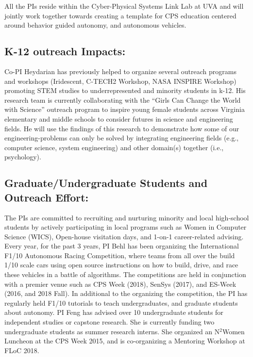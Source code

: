 All the PIs reside within the Cyber-Physical Systems Link Lab at UVA and will jointly work together towards creating a template for CPS education centered around behavior guided autonomy, and autonomous vehicles. 

\subsection{K-12 outreach Impacts:}
Co-PI Heydarian has previously helped to organize several outreach programs and workshops (Iridescent, C-TECH2 Workshop, NASA INSPIRE Workshop) promoting STEM studies to underrepresented and minority students in k-12. His research team is currently collaborating with the “Girls Can Change the World with Science” outreach program to inspire young female students across Virginia elementary and middle schools to consider futures in science and engineering fields. He will use the findings of this research to demonstrate how some of our engineering-problems can only be solved by integrating engineering fields (e.g., computer science, system engineering) and other domain(s) together (i.e., psychology). 



\subsection{Graduate/Undergraduate Students and Outreach Effort:}
The PIs are committed to recruiting and nurturing minority and local high-school students by actively participating in local programs such as Women in Computer Science (WICS),  Open-house visitation days, and 1-on-1 career-related advising.
Every year, for the past 3 years, PI Behl has been organizing the International F1/10 Autonomous Racing Competition, where teams from all over the build 1/10 scale cars using open source instructions on how to build, drive, and race these vehicles in a battle of algorithms. The competitions are held in conjunction with a premier venue such as CPS Week (2018), SenSys (2017), and ES-Week (2016, and 2018 Fall). In additional to the organizing the competition, the PI has regularly held F1/10 tutorials to teach undergraduates, and graduate students about autonomy. 
PI Feng has advised over 10 undergraduate students for independent studies or capstone research. She is currently funding two undergraduate students as summer research interns. She organized an N$^2$Women Luncheon at the CPS Week 2015, and is co-organizing a Mentoring Workshop at FLoC 2018.

